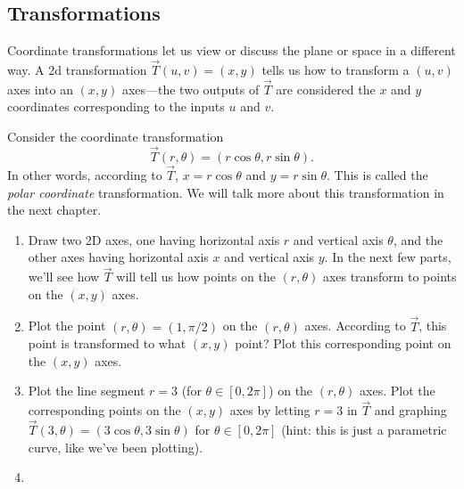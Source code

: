 \subsection{Transformations}

Coordinate transformations let us view or discuss the plane or space in a different way.  A 2d transformation $\vec T(u,v)=(x,y)$ tells us how to transform a $(u,v)$ axes into an $(x,y)$ axes---the two outputs of $\vec T$ are considered the $x$ and $y$ coordinates corresponding to the inputs $u$ and $v$.

\begin{problem} \label{polar coordinate transformation graph}%
%
%
Consider the coordinate transformation $$\vec T(r,\theta) = (r\cos\theta,r\sin\theta).$$  In other words, according to $\vec T$, $x=r\cos\theta$ and $y=r\sin\theta$.  This is called the \emph{polar coordinate} transformation.  We will talk more about this transformation in the next chapter.
\begin{enumerate}
\item Draw two 2D axes, one having horizontal axis $r$ and vertical axis $\theta$, and the other axes having horizontal axis $x$ and vertical axis $y$.  In the next few parts, we'll see how $\vec T$ will tell us how points on the $(r,\theta)$ axes transform to points on the $(x,y)$ axes.
\item Plot the point $(r,\theta)=(1,\pi/2)$ on the $(r,\theta)$ axes.  According to $\vec T$, this point is transformed to what $(x,y)$ point?  Plot this corresponding point on the $(x,y)$ axes.
\item{}  Plot the line segment $r=3$ (for $\theta\in [0,2\pi]$) on the $(r,\theta)$ axes.  Plot the corresponding points on the $(x,y)$ axes by letting $r=3$ in $\vec T$ and graphing $\vec T(3,\theta)=(3\cos\theta,3\sin\theta)$ for $\theta\in[0,2\pi]$ (hint: this is just a parametric curve, like we've been plotting).
\item{}%

\end{enumerate}
\end{problem}
